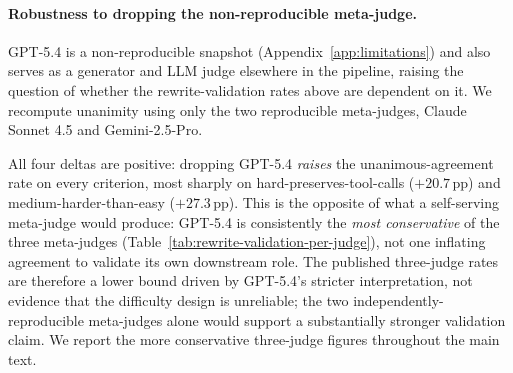 \paragraph{Robustness to dropping the non-reproducible meta-judge.}
GPT-5.4 is a non-reproducible snapshot (Appendix~\ref{app:limitations}) and also serves as a generator and LLM judge elsewhere in the pipeline, raising the question of whether the rewrite-validation rates above are dependent on it. We recompute unanimity using only the two reproducible meta-judges, Claude Sonnet 4.5 and Gemini-2.5-Pro.

\begin{table}[h!]
\centering
\small
\setlength{\tabcolsep}{4pt}
\renewcommand{\arraystretch}{1.1}
\caption{Unanimous-agreement rate on each rewrite-validation criterion, Claude Sonnet 4.5 + Gemini-2.5-Pro only ($n=198$), versus the published three-meta-judge rate. $\Delta = $ 2-judge $-$ 3-judge.}
\label{tab:rewrite-validation-no-gpt54}
\end{table}

All four deltas are positive: dropping GPT-5.4 \emph{raises} the unanimous-agreement rate on every criterion, most sharply on hard-preserves-tool-calls ($+20.7$\,pp) and medium-harder-than-easy ($+27.3$\,pp). This is the opposite of what a self-serving meta-judge would produce: GPT-5.4 is consistently the \emph{most conservative} of the three meta-judges (Table~\ref{tab:rewrite-validation-per-judge}), not one inflating agreement to validate its own downstream role. The published three-judge rates are therefore a lower bound driven by GPT-5.4's stricter interpretation, not evidence that the difficulty design is unreliable; the two independently-reproducible meta-judges alone would support a substantially stronger validation claim. We report the more conservative three-judge figures throughout the main text.

